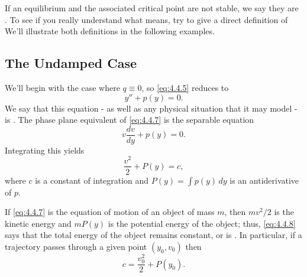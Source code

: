 \documentclass{ximera}
\begin{document}
\begin{center}
\end{center}

 
If an equilibrium and the associated critical point are not stable, we
say they are . To see if you really understand what
 means, try to give a direct definition of 
We'll illustrate both definitions in
the following examples.
 
 
\subsection*{The Undamped Case}
 
We'll begin with the case where $q\equiv0$, so  \eqref{eq:4.4.5}
reduces to
 \begin{equation} \label{eq:4.4.7}
y''+p(y)=0.
\end{equation}
We say that this equation - as well as any physical situation
that it may model - is .
The phase plane equivalent of \eqref{eq:4.4.7} is  the
separable equation
$$
v\frac{dv}{dy}+p(y)=0.
$$
 Integrating this  yields
\begin{equation} \label{eq:4.4.8}
\frac{v^2}{2}+P(y)=c,
\end{equation}
where $c$ is a constant of integration and $P(y)=\int p(y)\,dy$ is an
antiderivative of $p$.
 
If \eqref{eq:4.4.7} is the equation of motion of an object of
mass $m$, then
 $mv^2/2$ is the kinetic energy and $mP(y)$ is the
potential energy of the object;   thus, \eqref{eq:4.4.8} says that the
total
energy of the object remains constant, or is . In
particular, if a trajectory passes through a given point $(y_0,v_0)$
then
$$
c=\frac{v_0^2}{2}+P(y_0).
$$
 
\end{document}
